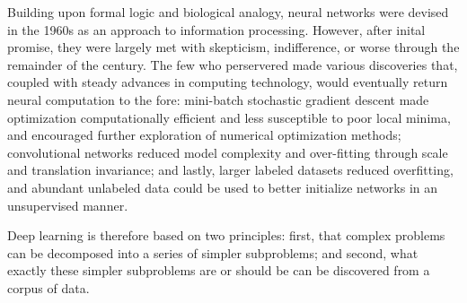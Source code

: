Building upon formal logic and biological analogy, neural networks were devised in the 1960s as an approach to information processing.
However, after inital promise, they were largely met with skepticism, indifference, or worse through the remainder of the century.
The few who perservered made various discoveries that, coupled with steady advances in computing technology, would eventually return neural computation to the fore:
mini-batch stochastic gradient descent made optimization computationally efficient and less susceptible to poor local minima, and encouraged further exploration of numerical optimization methods;
convolutional networks reduced model complexity and over-fitting through scale and translation invariance;
and lastly, larger labeled datasets reduced overfitting, and abundant unlabeled data could be used to better initialize networks in an unsupervised manner.

Deep learning is therefore based on two principles: first, that complex problems can be decomposed into a series of simpler subproblems; and second, what exactly these simpler subproblems are or should be can be discovered from a corpus of data.
